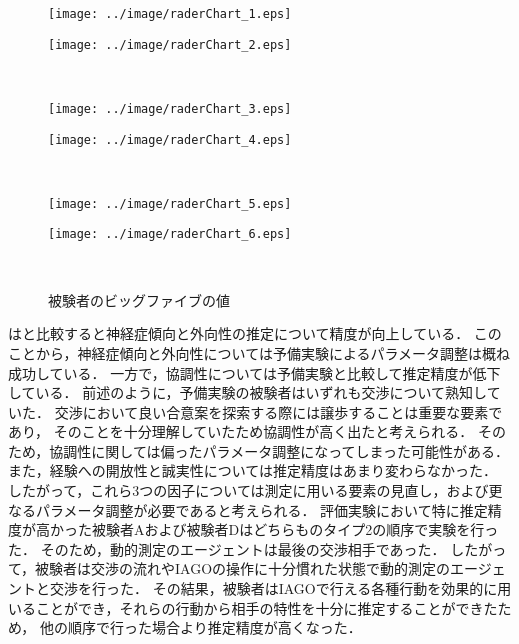 \begin{figure}[!bt]
    \begin{minipage}[b]{0.47\linewidth}
        \centering
        \texttt{[image: ../image/raderChart\_1.eps]}
        \label{fig:big5_sub1}
    \end{minipage}
    \begin{minipage}[b]{0.47\linewidth}
        \centering
        \texttt{[image: ../image/raderChart\_2.eps]}
        \label{fig:big5_sub2}
    \end{minipage}\\
    \begin{minipage}[b]{0.47\linewidth}
        \centering
        \texttt{[image: ../image/raderChart\_3.eps]}
        \label{fig:big5_sub3}
    \end{minipage}
    \begin{minipage}[b]{0.47\linewidth}
        \centering
        \texttt{[image: ../image/raderChart\_4.eps]}
        \label{fig:big5_sub4}
    \end{minipage}\\
    \begin{minipage}[b]{0.47\linewidth}
        \centering
        \texttt{[image: ../image/raderChart\_5.eps]}
        \label{fig:big5_sub5}
    \end{minipage}
    \begin{minipage}[b]{0.47\linewidth}
        \centering
        \texttt{[image: ../image/raderChart\_6.eps]}
        \label{fig:big5_sub6}
    \end{minipage}\\
    \caption{被験者のビッグファイブの値}\label{fig:big5}
\end{figure}

はと比較すると神経症傾向と外向性の推定について精度が向上している．
このことから，神経症傾向と外向性については予備実験によるパラメータ調整は概ね成功している．
一方で，協調性については予備実験と比較して推定精度が低下している．
前述のように，予備実験の被験者はいずれも交渉について熟知していた．
交渉において良い合意案を探索する際には譲歩することは重要な要素であり，
そのことを十分理解していたため協調性が高く出たと考えられる．
そのため，協調性に関しては偏ったパラメータ調整になってしまった可能性がある．
また，経験への開放性と誠実性については推定精度はあまり変わらなかった．
したがって，これら3つの因子については測定に用いる要素の見直し，および更なるパラメータ調整が必要であると考えられる．
評価実験において特に推定精度が高かった被験者Aおよび被験者Dはどちらものタイプ2の順序で実験を行った．
そのため，動的測定のエージェントは最後の交渉相手であった．
したがって，被験者は交渉の流れやIAGOの操作に十分慣れた状態で動的測定のエージェントと交渉を行った．
その結果，被験者はIAGOで行える各種行動を効果的に用いることができ，それらの行動から相手の特性を十分に推定することができたため，
他の順序で行った場合より推定精度が高くなった．

